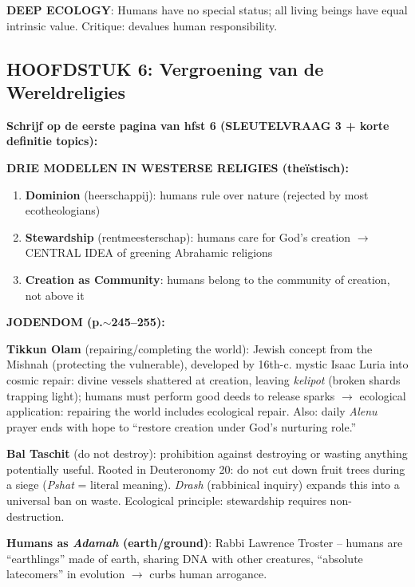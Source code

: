 \documentclass[a4paper,10pt]{article}
\begin{document}
\textbf{DEEP ECOLOGY}: Humans have no special status; all living beings have equal intrinsic value. Critique: devalues human responsibility.

\vspace{3pt}

\subsection{HOOFDSTUK 6: Vergroening van de Wereldreligies}

\textbf{Schrijf op de eerste pagina van hfst 6 (SLEUTELVRAAG 3 + korte definitie topics):}

\textbf{DRIE MODELLEN IN WESTERSE RELIGIES (theïstisch):}
\begin{enumerate}[noitemsep]
  \item \textbf{Dominion} (heerschappij): humans rule over nature (rejected by most ecotheologians)
  \item \textbf{Stewardship} (rentmeesterschap): humans care for God's creation $\to$ CENTRAL IDEA of greening Abrahamic religions
  \item \textbf{Creation as Community}: humans belong to the community of creation, not above it
\end{enumerate}

\textbf{JODENDOM (p.$\sim$245--255):}

\textbf{Tikkun Olam} (repairing/completing the world): Jewish concept from the Mishnah (protecting the vulnerable), developed by 16th-c. mystic Isaac Luria into cosmic repair: divine vessels shattered at creation, leaving \textit{kelipot} (broken shards trapping light); humans must perform good deeds to release sparks $\to$ ecological application: repairing the world includes ecological repair. Also: daily \textit{Alenu} prayer ends with hope to ``restore creation under God's nurturing role.''

\textbf{Bal Taschit} (do not destroy): prohibition against destroying or wasting anything potentially useful. Rooted in Deuteronomy 20: do not cut down fruit trees during a siege (\textit{Pshat} = literal meaning). \textit{Drash} (rabbinical inquiry) expands this into a universal ban on waste. Ecological principle: stewardship requires non-destruction.

\textbf{Humans as \textit{Adamah} (earth/ground)}: Rabbi Lawrence Troster -- humans are ``earthlings'' made of earth, sharing DNA with other creatures, ``absolute latecomers'' in evolution $\to$ curbs human arrogance.
\end{document}
